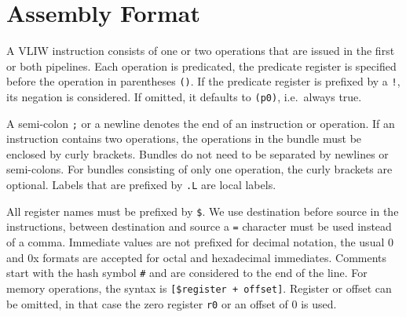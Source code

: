 \documentclass[a4paper,fontsize=10pt,twoside,DIV15,BCOR12mm,headinclude=true,footinclude=false,pagesize,bibtotoc]{scrbook}
\newcommand{\comment}[3]{

\textsf{\textbf{#1}} {\color{#3}#2}}
\newcommand{\martin}[1]{\comment{Martin}{#1}{Blue}}
\newcommand{\stefan}[1]{\comment{Stefan}{#1}{RoyalPurple}}
\renewcommand{\martin}[1]{}
\renewcommand{\stefan}[1]{}
\begin{document}
\stefan{From what I see in the code, it might also help a lot to allow SWS in the
second pipeline, as they are quite common. Predicate instructions are not that common
now but this will change with the new single-path passes.

This section should also talk about hazards, i.e., can we predicate the second
slot with something that we write in the first slot, what if we use a GP register
in both slots and write to it, ... }

\martin{TODO: agree that we/I should write more on this. Currently
Wolfgang has implemented ALU and predicate operations in both
pipelines. More details shall be described.}

\stefan{Is MFS/MTS allowed in both pipelines (and at the same time)? Should be helpful for prologue/epiloge code,
especially when we move return infos back to special registers.}


\section{Assembly Format}

\martin{This is not pasim, right?}

A VLIW instruction consists of one or two operations that are issued in the first or both pipelines.
Each operation is predicated, the predicate register is specified before the operation in parentheses \texttt{()}.
If the predicate register is prefixed by a \texttt{!}, its negation is considered.
If omitted, it defaults to \texttt{(p0)}, i.e.\ always true.

A semi-colon \texttt{;} or a newline denotes the end of an instruction or operation. If an instruction contains two operations, the operations
in the bundle must be enclosed by curly brackets. Bundles do not need to be separated by newlines or semi-colons. For bundles consisting of
only one operation, the curly brackets are optional. Labels that are prefixed by \texttt{.L} are local labels.

All register names must be prefixed by \texttt{\$}.
We use destination before source in the instructions, between destination and source a \texttt{=} character must be used instead of a comma.
Immediate values are not prefixed for decimal notation, the usual 0 and 0x formats are accepted for octal and hexadecimal immediates.
Comments start with the hash symbol \texttt{\#} and are considered to the end of the line. For memory operations, the syntax is
\texttt{[\$register + offset]}. Register or offset can be omitted, in that case the zero register \texttt{r0} or an offset of $0$ is used.
\end{document}
